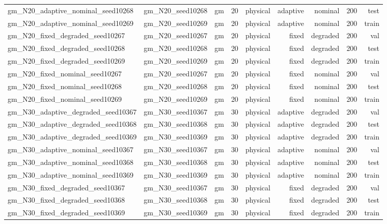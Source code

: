 \begin{tabular}{lrrrrrrrr}
gm\_N20\_adaptive\_nominal\_seed10268 & gm\_N20\_seed10268 & gm & 20 & physical & adaptive & nominal & 200 & test \\
gm\_N20\_adaptive\_nominal\_seed10269 & gm\_N20\_seed10269 & gm & 20 & physical & adaptive & nominal & 200 & train \\
gm\_N20\_fixed\_degraded\_seed10267 & gm\_N20\_seed10267 & gm & 20 & physical & fixed & degraded & 200 & val \\
gm\_N20\_fixed\_degraded\_seed10268 & gm\_N20\_seed10268 & gm & 20 & physical & fixed & degraded & 200 & test \\
gm\_N20\_fixed\_degraded\_seed10269 & gm\_N20\_seed10269 & gm & 20 & physical & fixed & degraded & 200 & train \\
gm\_N20\_fixed\_nominal\_seed10267 & gm\_N20\_seed10267 & gm & 20 & physical & fixed & nominal & 200 & val \\
gm\_N20\_fixed\_nominal\_seed10268 & gm\_N20\_seed10268 & gm & 20 & physical & fixed & nominal & 200 & test \\
gm\_N20\_fixed\_nominal\_seed10269 & gm\_N20\_seed10269 & gm & 20 & physical & fixed & nominal & 200 & train \\
gm\_N30\_adaptive\_degraded\_seed10367 & gm\_N30\_seed10367 & gm & 30 & physical & adaptive & degraded & 200 & val \\
gm\_N30\_adaptive\_degraded\_seed10368 & gm\_N30\_seed10368 & gm & 30 & physical & adaptive & degraded & 200 & test \\
gm\_N30\_adaptive\_degraded\_seed10369 & gm\_N30\_seed10369 & gm & 30 & physical & adaptive & degraded & 200 & train \\
gm\_N30\_adaptive\_nominal\_seed10367 & gm\_N30\_seed10367 & gm & 30 & physical & adaptive & nominal & 200 & val \\
gm\_N30\_adaptive\_nominal\_seed10368 & gm\_N30\_seed10368 & gm & 30 & physical & adaptive & nominal & 200 & test \\
gm\_N30\_adaptive\_nominal\_seed10369 & gm\_N30\_seed10369 & gm & 30 & physical & adaptive & nominal & 200 & train \\
gm\_N30\_fixed\_degraded\_seed10367 & gm\_N30\_seed10367 & gm & 30 & physical & fixed & degraded & 200 & val \\
gm\_N30\_fixed\_degraded\_seed10368 & gm\_N30\_seed10368 & gm & 30 & physical & fixed & degraded & 200 & test \\
gm\_N30\_fixed\_degraded\_seed10369 & gm\_N30\_seed10369 & gm & 30 & physical & fixed & degraded & 200 & train \\

\end{tabular}
